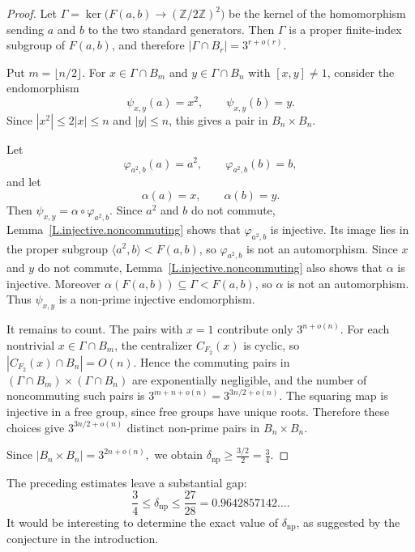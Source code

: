 \documentclass{amsproc}
\begin{document}
\begin{proof}
Let
$
        \Gamma=\ker\bigl(F(a,b)\to (\mathbb Z/2\mathbb Z)^2\bigr)
$
be the kernel of the homomorphism sending $a$ and $b$ to the two standard
generators.  Then $\Gamma$ is a proper finite-index subgroup of $F(a,b)$, and
therefore
$
        |\Gamma\cap B_r|=3^{r+o(r)}.
$

Put $m=\lfloor n/2\rfloor$.  For $x\in \Gamma\cap B_m$ and
$y\in \Gamma\cap B_n$ with $[x,y]\neq 1$, consider the endomorphism
\[
        \psi_{x,y}(a)=x^2,
        \qquad
        \psi_{x,y}(b)=y.
\]
Since $|x^2|\leq 2|x|\leq n$ and $|y|\leq n$, this gives a pair in
$B_n\times B_n$.

Let
\[
        \varphi_{a^2,b}(a)=a^2,
        \qquad
        \varphi_{a^2,b}(b)=b,
\]
and let
\[
        \alpha(a)=x,
        \qquad
        \alpha(b)=y.
\]
Then $\psi_{x,y}=\alpha\circ\varphi_{a^2,b}$.  Since $a^2$ and $b$ do not commute,
Lemma~\ref{L.injective.noncommuting} shows that $\varphi_{a^2,b}$ is injective.  Its
image lies in the proper subgroup $\langle a^2,b\rangle<F(a,b)$, so $\varphi_{a^2,b}$ is
not an automorphism.  Since $x$ and $y$ do not commute, Lemma~\ref{L.injective.noncommuting}
also shows that $\alpha$ is injective.  Moreover
$\alpha(F(a,b))\subseteq \Gamma<F(a,b)$, so $\alpha$ is not an automorphism.
Thus $\psi_{x,y}$ is a non-prime injective endomorphism.

It remains to count.  The pairs with $x=1$ contribute only $3^{n+o(n)}$.
For each nontrivial $x\in \Gamma\cap B_m$, the centralizer $C_{F_2}(x)$ is
cyclic, so
$
        |C_{F_2}(x)\cap B_n|=O(n).
$
Hence the commuting pairs in $(\Gamma\cap B_m)\times(\Gamma\cap B_n)$ are
exponentially negligible, and the number of noncommuting such pairs is
$
        3^{m+n+o(n)}=3^{3n/2+o(n)}.
$
The squaring map is injective in a free group, since free groups have unique
roots.  Therefore these choices give $3^{3n/2+o(n)}$ distinct non-prime pairs
in $B_n\times B_n$.

Since
$
        |B_n\times B_n|=3^{2n+o(n)},
$
we obtain
$
        \delta_{\mathrm{np}}\geq \frac{3/2}{2}=\frac34.
$
\end{proof}


The preceding estimates leave a substantial gap:
\[
        \frac34
        \leq \delta_{\mathrm{np}}
        \leq \frac{27}{28}=0.9642857142\ldots .
\]
It would be interesting to determine the exact value of $\delta_{\mathrm{np}}$, as suggested by the conjecture in the introduction.

\medskip
\end{document}
